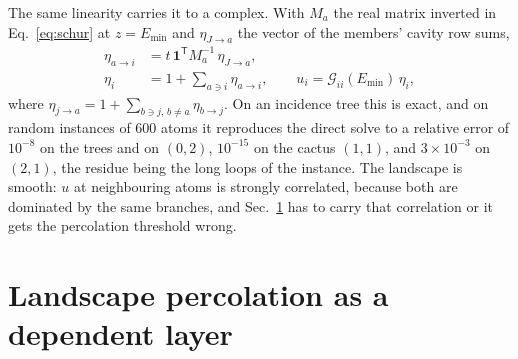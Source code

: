 The same linearity carries it to a complex. With $M_{a}$ the real matrix
inverted in Eq.~\eqref{eq:schur} at $z=E_{\min}$ and $\eta_{J\to a}$ the
vector of the members' cavity row sums,
\begin{equation}
  \begin{aligned}
  \eta_{a\to i}&=t\,\mathbf{1}^{\mathsf T}M_{a}^{-1}\,\eta_{J\to a},\\
  \eta_{i}&=1+\sum_{a\ni i}\eta_{a\to i},
  \qquad
  u_{i}=\mathcal{G}_{ii}(E_{\min})\,\eta_{i},
  \end{aligned}
  \label{eq:landscape}
\end{equation}
where $\eta_{j\to a}=1+\sum_{b\ni j,\,b\ne a}\eta_{b\to j}$. On an incidence
tree this is exact, and on random instances of $600$ atoms it reproduces
the direct solve to a relative error of $10^{-8}$ on the trees and on
$(0,2)$, $10^{-15}$ on the cactus $(1,1)$, and $3\times10^{-3}$ on
$(2,1)$, the residue being the long loops of the instance. The landscape is smooth: $u$ at neighbouring
atoms is strongly correlated, because both are dominated by the same
branches, and Sec.~\ref{sec:lltperc} has to carry that correlation or it
gets the percolation threshold wrong.

\section{Landscape percolation as a dependent layer}
\label{sec:lltperc}

